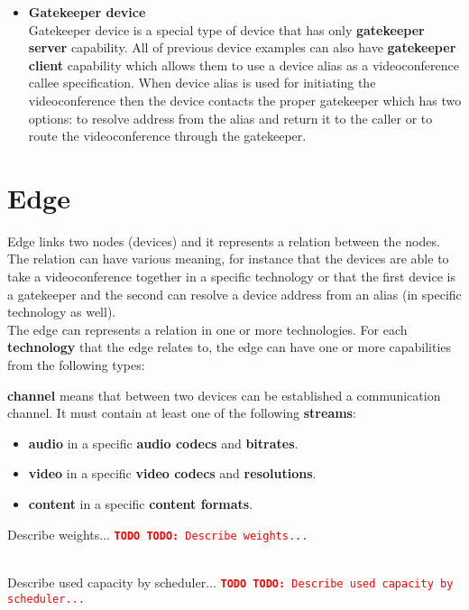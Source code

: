 \documentclass[a4paper]{report}
\newcommand{\TODO}[1]{%
\def\empty{}%
\def\prvniparametr{#1}%
\ifx\prvniparametr\empty%
\begingroup\tt\textcolor{red}{\noindent\textbf{TODO}}\endgroup
\else%
\begingroup\tt\textcolor{red}{\noindent\textbf{TODO:}\ #1}\endgroup
\fi%
}
\begin{document}
\begin{itemize}
\item \textbf{Gatekeeper device} \\
  Gatekeeper device is a special type of device that has only 
  \textbf{gatekeeper server} capability. All of previous device examples can 
  also have \textbf{gatekeeper client} capability which allows them to use a 
  device alias as a videoconference callee specification. When device alias is 
  used for initiating the videoconference then the device contacts the proper 
  gatekeeper which has two options: to resolve address from the alias and 
  return it to the caller or to route the videoconference through the 
  gatekeeper.
\end{itemize}
 

\section{Edge}

Edge links two nodes (devices) and it represents a relation between the 
nodes. The relation can have various meaning, for instance that the devices
are able to take a videoconference together in a specific technology or
that the first device is a gatekeeper and the second can resolve a device 
address from an alias (in specific technology as well).
\\
The edge can represents a relation in one or more technologies. For each \textbf{technology} that the edge relates to, the edge can have one or more 
capabilities from the following types:
\begin{compactitem}   
\item \textbf{channel} means that between two devices can be established
  a communication channel. It must contain at least one of the following 
  \textbf{streams}:
  \begin{itemize}
    \item \textbf{audio} in a specific \textbf{audio codecs} and 
      \textbf{bitrates}.
    \item \textbf{video} in a specific \textbf{video codecs} and 
      \textbf{resolutions}.
    \item \textbf{content} in a specific \textbf{content formats}.
  \end{itemize} 
  
\item \TODO{Describe weights...}
   \\ \TODO{Describe used capacity by scheduler...}
\end{compactitem}   
  
\end{document}
